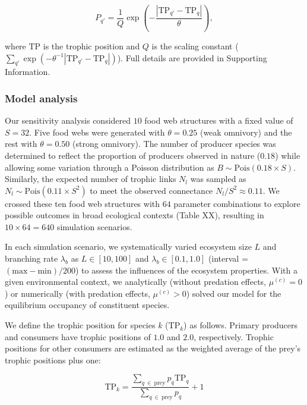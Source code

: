 \documentclass[11pt, class=article, crop=false]{standalone}
\begin{document}
\begin{equation}
    P_{q'} = \frac{1}{Q} \exp(-\frac{|\mbox{TP}_{q'} - \mbox{TP}_q|}{\theta}),
\end{equation}

where $\mbox{TP}$ is the trophic position and $Q$ is the scaling constant ($\sum_{q'} \exp(-\theta^{-1} |\mbox{TP}_{q'} - \mbox{TP}_q|)$).
Full details are provided in Supporting Information.

\subsubsection{Model analysis}

Our sensitivity analysis considered $10$ food web structures with a fixed value of $S = 32$.
Five food webs were generated with $\theta = 0.25$ (weak omnivory) and the rest with $\theta = 0.50$ (strong omnivory).
The number of producer species was determined to reflect the proportion of producers observed in nature ($0.18$) while allowing some variation through a Poisson distribution as $B \sim \mbox{Pois}(0.18 \times S)$.
Similarly, the expected number of trophic links $N_l$ was sampled as $N_l \sim \mbox{Pois}(0.11 \times S^2)$ to meet the observed connectance $N_l / S^2 \approx 0.11$.
We crossed these ten food web structures with $64$ parameter combinations to explore possible outcomes in broad ecological contexts (Table XX), resulting in $10 \times 64 = 640$ simulation scenarios.

In each simulation scenario, we systematically varied ecosystem size $L$ and branching rate $\lambda_b$ as $L \in [10, 100]$ and $\lambda_b \in [0.1, 1.0]$ (interval = $(\text{max} - \text{min}) / 200$) to assess the influences of the ecosystem properties.
With a given environmental context, we analytically (without predation effects, $\mu^{(c)} = 0$) or numerically (with predation effects, $\mu^{(c)} > 0$)  solved our model for the equilibrium occupancy of constituent species.

We define the trophic position for species $k$ ($\text{TP}_k$) as follows.
Primary producers and consumers have trophic positions of $1.0$ and $2.0$, respectively.
Trophic positions for other consumers are estimated as the weighted average of the prey's trophic positions plus one:

\begin{equation}
    \mbox{TP}_k = \frac{\sum_{q~\in~\text{prey}} p_{q} \mbox{TP}_q}{\sum_{q~\in~\text{prey}} p_{q}} + 1
\end{equation}
\end{document}
